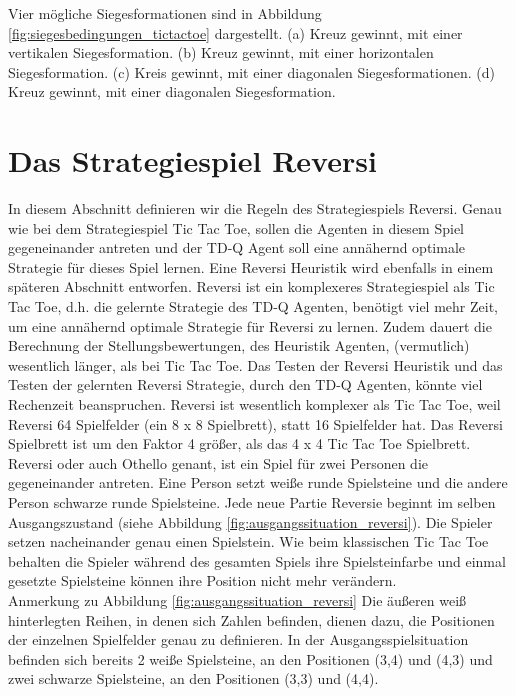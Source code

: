 Vier mögliche Siegesformationen sind in Abbildung \ref{fig:siegesbedingungen_tictactoe} dargestellt. (a) Kreuz gewinnt, mit einer vertikalen Siegesformation. (b) Kreuz gewinnt, mit einer horizontalen Siegesformation. (c) Kreis gewinnt, mit einer diagonalen Siegesformationen. (d) Kreuz gewinnt, mit einer diagonalen Siegesformation.

\section{Das Strategiespiel Reversi}
\label{sec:Das Strategiespiel Reversi}
In diesem Abschnitt definieren wir die Regeln des Strategiespiels Reversi. Genau wie bei dem Strategiespiel Tic Tac Toe, sollen die Agenten in diesem Spiel gegeneinander antreten und der TD-Q Agent soll eine annähernd optimale Strategie für dieses Spiel lernen. Eine Reversi Heuristik wird ebenfalls in einem späteren Abschnitt entworfen. Reversi ist ein komplexeres Strategiespiel als Tic Tac Toe, d.h. die gelernte Strategie des TD-Q Agenten, benötigt viel mehr Zeit, um eine annähernd optimale Strategie für Reversi zu lernen. Zudem dauert die Berechnung der Stellungsbewertungen, des Heuristik Agenten, (vermutlich) wesentlich länger, als bei Tic Tac Toe. Das Testen der Reversi Heuristik und das Testen der gelernten Reversi Strategie, durch den TD-Q Agenten, könnte viel Rechenzeit beanspruchen. Reversi ist wesentlich komplexer als Tic Tac Toe, weil Reversi 64 Spielfelder (ein 8 x 8 Spielbrett), statt 16 Spielfelder hat. Das Reversi Spielbrett ist um den Faktor 4 größer, als das 4 x 4 Tic Tac Toe Spielbrett. \\

Reversi oder auch Othello genant, ist ein Spiel für zwei Personen die gegeneinander antreten. Eine Person setzt weiße runde Spielsteine und die andere Person schwarze runde Spielsteine. Jede neue Partie Reversie beginnt im selben Ausgangszustand (siehe Abbildung \ref{fig:ausgangssituation_reversi}). Die Spieler setzen nacheinander genau einen Spielstein. Wie beim klassischen Tic Tac Toe behalten die Spieler während des gesamten Spiels ihre Spielsteinfarbe und einmal gesetzte Spielsteine können ihre Position nicht mehr verändern. \\

Anmerkung zu Abbildung \ref{fig:ausgangssituation_reversi}  Die äußeren weiß hinterlegten Reihen, in denen sich Zahlen befinden, dienen dazu, die Positionen der einzelnen Spielfelder genau zu definieren. In der Ausgangsspielsituation befinden sich bereits 2 weiße Spielsteine, an den Positionen (3,4) und (4,3) und zwei schwarze Spielsteine, an den Positionen (3,3) und (4,4). \\

